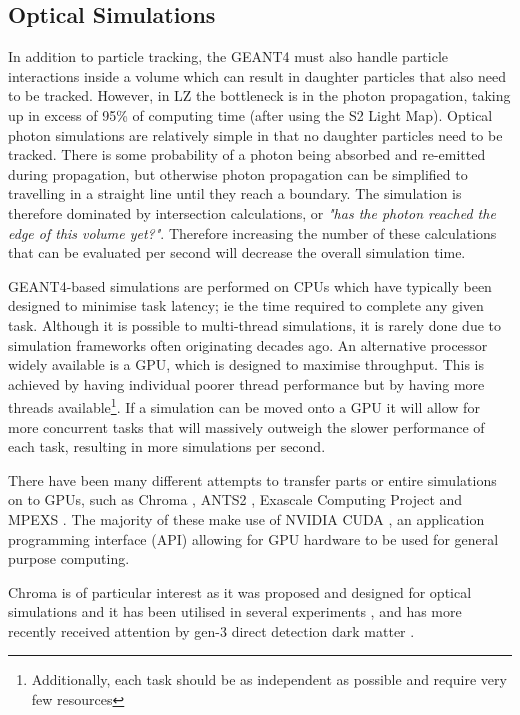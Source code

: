 \subsection{Optical Simulations}
\par
In addition to particle tracking, the GEANT4 must also handle particle interactions inside a volume which can result in daughter particles that also need to be tracked.
However, in LZ the bottleneck is in the photon propagation, taking up in excess of 95\% of computing time (after using the S2 Light Map).
Optical photon simulations are relatively simple in that no daughter particles need to be tracked.
There is some probability of a photon being absorbed and re-emitted during propagation, but otherwise photon propagation can be simplified to travelling in a straight line until they reach a boundary.
The simulation is therefore dominated by intersection calculations, or \textit{"has the photon reached the edge of this volume yet?"}.
Therefore increasing the number of these calculations that can be evaluated per second will decrease the overall simulation time.
\par
GEANT4-based simulations are performed on CPUs which have typically been designed to minimise task latency; ie the time required to complete any given task.
Although it is possible to multi-thread simulations, it is rarely done due to simulation frameworks often originating decades ago.
An alternative processor widely available is a GPU, which is designed to maximise throughput.
This is achieved by having individual poorer thread performance but by having more threads available\footnote{Additionally, each task should be as independent as possible and require very few resources}.
If a simulation can be moved onto a GPU it will allow for more concurrent tasks that will massively outweigh the slower performance of each task, resulting in more simulations per second.
\par
There have been many different attempts to transfer parts or entire simulations on to GPUs, such as Chroma \cite{chroma_whitepaper_ref}, ANTS2 \cite{ants2_whitepaper_ref}, Exascale Computing Project \cite{ExaSMR_whitepaper_ref} and MPEXS \cite{mpexs_whitepaper_ref}.
The majority of these make use of NVIDIA CUDA \cite{cuda_ref}, an application programming interface (API) allowing for GPU hardware to be used for general purpose computing.
\par
Chroma is of particular interest as it was proposed and designed for optical simulations and it has been utilised in several experiments \cite{chroma_with_tpcs1_ref,chroma_with_tpcs2_ref,chroma_with_tpcs3_ref}, and has more recently received attention by gen-3 direct detection dark matter \cite{DARWIN_GPU_simulations_2022_ref}.

